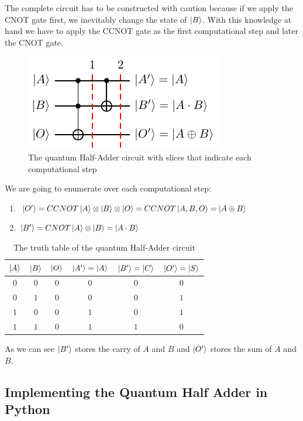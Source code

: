 The complete circuit has to be constructed with caution because if we apply the CNOT gate first, we inevitably change the state of $\ket{B}$. With this
knowledge at hand we have to apply the CCNOT gate as the first computational step and later the CNOT gate.

\begin{figure}[!ht]
    \centering
    \includegraphics{images/5_Implementation/half_adder.pdf}
    \caption{The quantum Half-Adder circuit with slices that indicate each computational step}
\end{figure}

We are going to enumerate over each computational step:
\begin{enumerate}
    \item $\ket{O'} = CCNOT\ket{A}\otimes\ket{B}\otimes\ket{O} = CCNOT\ket{A,B,O} = \ket{A \oplus B}$
    \item $\ket{B'} = CNOT\ket{A}\otimes\ket{B} = \ket{A \cdot B}$
\end{enumerate}

\begin{table}[!ht]
    \centering
    \begin{tabular}{ccc|ccc}
        $\ket{A}$ & $\ket{B}$ & $\ket{O}$ & $\ket{A'} = \ket{A}$ & $\ket{B'} = \ket{C}$ & $\ket{O'} = \ket{S}$ \\
        \hline
        $0$ & $0$ & $0$ & $0$ & $0$ & $0$ \\
        $0$ & $1$ & $0$ & $0$ & $0$ & $1$ \\
        $1$ & $0$ & $0$ & $1$ & $0$ & $1$ \\
        $1$ & $1$ & $0$ & $1$ & $1$ & $0$ \\
    \end{tabular}
    \caption{The truth table of the quantum Half-Adder circuit}
\end{table}

As we can see $\ket{B'}$ stores the carry of $A$ and $B$ and $\ket{O'}$ stores the sum of $A$ and $B$.

\subsection{Implementing the Quantum Half Adder in Python}

